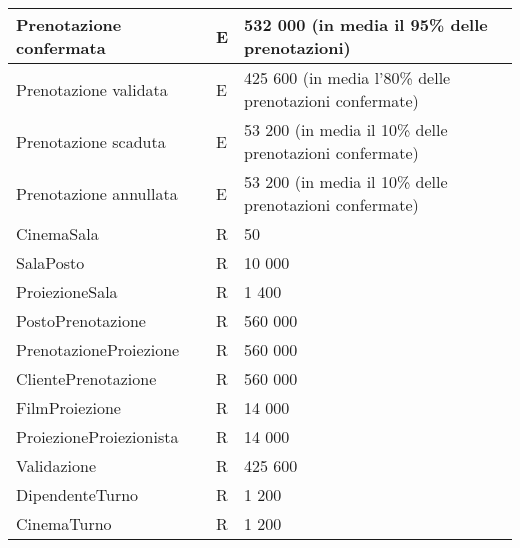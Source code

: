 \begin{tabularx}{\linewidth}{|X|l|X|}
    Prenotazione confermata
     & E
     & 532 000 (in media il 95\% delle prenotazioni)
    \\ \hline
    Prenotazione validata
     & E
     & 425 600 (in media l'80\% delle prenotazioni confermate)
    \\ \hline
    Prenotazione scaduta
     & E
     & 53 200 (in media il 10\% delle prenotazioni confermate)
    \\ \hline
    Prenotazione annullata
     & E
     & 53 200 (in media il 10\% delle prenotazioni confermate)
    \\ \hline
    CinemaSala
     & R
     & 50
    \\ \hline
    SalaPosto
     & R
     & 10 000
    \\ \hline
    ProiezioneSala
     & R
     & 1 400
    \\ \hline
    PostoPrenotazione
     & R
     & 560 000
    \\ \hline
    PrenotazioneProiezione
     & R
     & 560 000
    \\ \hline
    ClientePrenotazione
     & R
     & 560 000
    \\ \hline
    FilmProiezione
     & R
     & 14 000
    \\ \hline
    ProiezioneProiezionista
     & R
     & 14 000
    \\ \hline
    Validazione
     & R
     & 425 600
    \\ \hline
    DipendenteTurno
     & R
     & 1 200
    \\ \hline
    CinemaTurno
     & R
     & 1 200
    \\ \hline
\end{tabularx}

